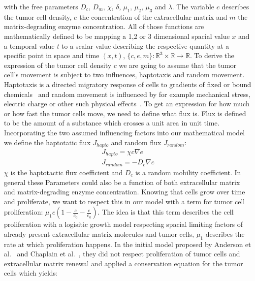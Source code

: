 with the free parameters $D_c$, $D_m$, $\chi$, $\delta$, $\mu_1$, $\mu_2$, $\mu_3$ and $\lambda$. \newline
The variable $c$ describes the tumor cell density, $e$ the concentration of the extracellular matrix and $m$ the matrix-degrading enzyme concentration. All of those functions are mathematically defined to be mapping a 1,2 or 3 dimensional spacial value $x$ and a temporal value $t$ to a scalar value describing the respective quantity at a specific point in space and time $(x,t)$, $\{c,e,m\} : \mathbb{R}^{3} \times \mathbb{R} \rightarrow \mathbb{R}$.\newline
To derive the expression of the tumor cell density $c$ we are going to assume that the tumor cell's movement is subject to two influences, haptotaxis and random movement. Haptotaxis is a directed migratory response of cells to gradients of fixed or bound chemicals~\cite{anderson_continuous_1998} and random movement is influenced by for example mechanical stress, electric charge or other such physical effects~\cite{Merino-Casallo2022-di}. To get an expression for how much or how fast the tumor cells move, we need to define what flux is. Flux is defined to be the amount of a substance  which crosses a unit area in unit time. Incorporating the two assumed influencing factors into our mathematical model we define the haptotatic flux $J_{hapto}$ and random flux $J_{random}$:
\begin{align*}
    J_{hapto} = \chi c \nabla e \\
    J_{random} = -D_c \nabla c
\end{align*}
$\chi$ is the haptotactic flux coefficient and $D_c$ is a random mobility coefficient. In general these Parameters could also be a function of both extracellular matrix and matrix-degrading enzyme concentration. Knowing that cells grow over time and proliferate, we want to respect this in our model with a term for tumor cell proliferation: $\mu_1 c (1-\frac{c}{c_0} - \frac{e}{e_0})$.\newline  
The idea is that this term describes the cell proliferation with a logisitic growth model respecting spacial limiting factors of already present extracellular matrix molecules and tumor cells, $\mu_1$ describes the rate at which proliferation happens. In the initial model proposed by Anderson et al.~\cite{anderson_continuous_1998, anderson_mathematical_2000} and Chaplain et al.~\cite{anderson_continuous_1998,chaplain_mathematical_2006,chaplain_mathematical_2006-1,franssen_mathematical_2019}, they did not respect proliferation of tumor cells and extracellular matrix renewal and applied a conservation equation for the tumor cells which yields:
